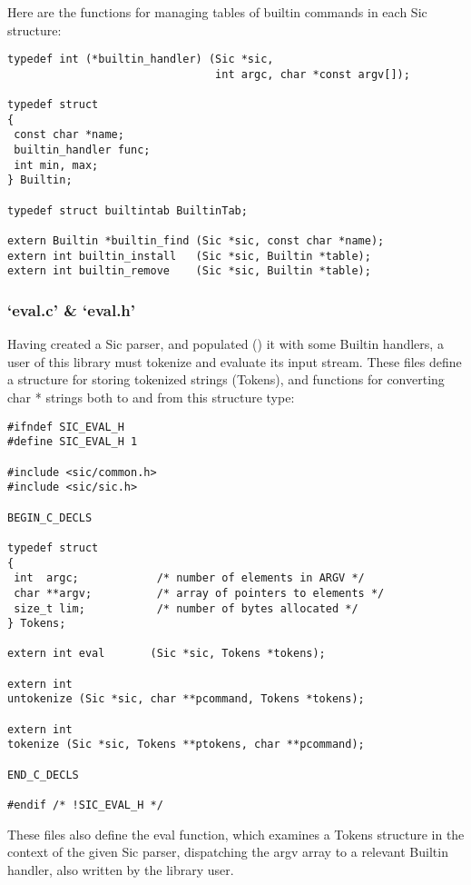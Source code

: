 Here are the functions for managing tables of builtin commands in each Sic structure: 
\begin{Verbatim}[frame=single]
typedef int (*builtin_handler) (Sic *sic,
                                int argc, char *const argv[]);

typedef struct 
{
 const char *name;
 builtin_handler func;
 int min, max;
} Builtin;

typedef struct builtintab BuiltinTab;

extern Builtin *builtin_find (Sic *sic, const char *name);
extern int builtin_install   (Sic *sic, Builtin *table);
extern int builtin_remove    (Sic *sic, Builtin *table);
\end{Verbatim}

\subsubsection{`eval.c' \& `eval.h'}


Having created a Sic parser, and populated ({\MbQ{}}) it with some Builtin 
handlers, a user of this library must tokenize and evaluate its input stream.
These files define a structure for storing tokenized strings (Tokens), and 
functions for converting char * strings both to and from this structure type: 

\begin{Verbatim}[frame=single]
#ifndef SIC_EVAL_H
#define SIC_EVAL_H 1

#include <sic/common.h>
#include <sic/sic.h>

BEGIN_C_DECLS

typedef struct 
{
 int  argc;            /* number of elements in ARGV */
 char **argv;          /* array of pointers to elements */
 size_t lim;           /* number of bytes allocated */
} Tokens;

extern int eval       (Sic *sic, Tokens *tokens);

extern int 
untokenize (Sic *sic, char **pcommand, Tokens *tokens);

extern int 
tokenize (Sic *sic, Tokens **ptokens, char **pcommand);

END_C_DECLS

#endif /* !SIC_EVAL_H */
\end{Verbatim}

These files also define the eval function, which examines a Tokens structure 
in the context of the given Sic parser, dispatching the argv array to a 
relevant Builtin handler, also written by the library user. 

